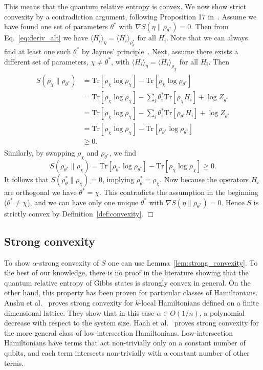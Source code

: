 \documentclass[
    aps,
    prx,
    floatfix,
    nofootinbib,
    onecolumn
]{revtex4-2}
\newcommand{\Tr}{\mathrm{Tr}}
\begin{document}
This means that the quantum relative entropy is convex. We now show strict convexity by a contradiction argument, following Proposition 17 in~\cite{Anshu_2021}. Assume we have found one set of parameters $\theta^*$ with $\nabla S(\eta \|\rho_{\theta^*})=0$. Then from Eq.~\eqref{eq:deriv_alt} we have $\langle H_{i}\rangle_\eta =\langle H_{i} \rangle_{\rho_\theta^*}$ for all $H_{i}$. Note that we can always find at least one such $\theta^*$ by Jaynes' principle~\cite{jaynes1957}. Next, assume there exists a different set of parameters, $\chi\neq\theta^*$, with $\langle H_{i}\rangle_\eta =\langle H_{i} \rangle_{\rho_\chi}$ for all $H_{i}$. Then
\begin{align}
\begin{split}
S(\rho_\chi \| \rho_{\theta^*}) &= \Tr[ \rho_\chi\log{\rho_\chi} ]-\Tr[ \rho_\chi\log{\rho_{\theta^*}} ] \\
&= \Tr[\rho_\chi\log{\rho_\chi}] - \sum_{i}\theta^*_{i}\Tr[\rho_\chi H_{i}] +\log{Z_{\theta^*}} \\
&= \Tr[\rho_\chi\log{\rho_\chi}] - \sum_{i}\theta^*_{i}\Tr[\rho_{\theta^*} H_{i}] +\log{Z_{\theta^*}} \\
&= \Tr[\rho_\chi\log{\rho_\chi}] - \Tr[\rho_{\theta^*}\log{\rho_{\theta^*}}] \\
&\geq 0. 
\end{split}
\end{align} 
Similarly, by swapping $\rho_\chi$ and $\rho_{\theta^*}$, we find \begin{equation}
S(\rho_{\theta^*}\|\rho_\chi) = \Tr[\rho_{\theta^*}\log{\rho_{\theta^*}}] - \Tr[\rho_\chi\log{\rho_\chi}] \geq 0.
\end{equation} 
It follows that $S(\rho_\theta^*\|\rho_\chi)=0$, implying $\rho_\theta^* = \rho_\chi$. Now because the operators $H_{i}$ are orthogonal we have $\theta^*=\chi$. This contradicts the assumption in the beginning ($\theta^*\neq\chi$), and we can have only one unique $\theta^*$ with $\nabla S(\eta \|\rho_{\theta^*})=0$. Hence $S$ is strictly convex by Definition~\ref{def:convexity}. $\Box$


\subsection{Strong convexity}
\label{app:strong_conv_numerics}

To show $\alpha$-strong convexity of $S$ one can use Lemma~\ref{lem:strong_convexity}. To the best of our knowledge, there is no proof in the literature showing that the quantum relative entropy of Gibbs states is strongly convex in general. On the other hand, this property has been proven for particular classes of Hamiltonians. Anshu et al.~\cite{Anshu_2021} proves strong convexity for $k$-local Hamiltonians defined on a finite dimensional lattice. They show that in this case $\alpha \in O(1/n)$, a polynomial decrease with respect to the system size. Haah et al.~\cite{Haah_2022} proves strong convexity for the more general class of low-intersection Hamiltonians. Low-intersection Hamiltonians have terms that act non-trivially only on a constant number of qubits, and each term intersects non-trivially with a constant number of other terms.
\end{document}
